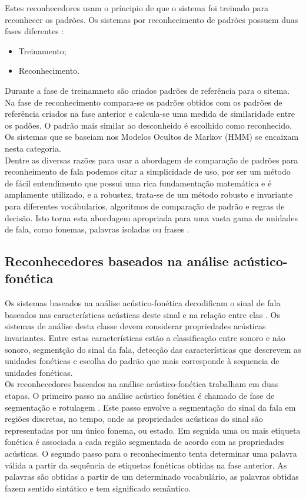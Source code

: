 Estes reconhecedores usam o príncipio de que o sistema foi treinado para reconhecer os padrões. Os sistemas por reconhecimento de padrões possuem duas fases diferentes :
\begin{itemize}
\item Treinamento;
\item Reconhecimento.
\end{itemize}

Durante a fase de treinamneto são criados padrões de referência para o sitema. Na fase de reconhecimento compara-se os padrões obtidos com os padrões de referência criados na fase anterior e calcula-se uma medida de similaridade entre os padões. O padrão mais similar ao desconheido é escolhido como reconhecido. Os sistemas que se baseiam nos Modelos Ocultos de Markov (HMM) se encaixam nesta categoria.\\

Dentre as diversas razões para usar a abordagem de comparação de padrões para reconheimento de fala podemos citar a simplicidade de uso, por ser um método de fácil entendimento que possui uma rica fundamentação matemática e é amplamente utilizado,  e a robustez, trata-se de um método robusto e invariante para diferentes vocábularios, algoritmos de comparação de padrão e regras de decisão. Isto torna esta abordagem apropriada para uma vasta gama de unidades de fala, como fonemas, palavras isoladas ou frases  \cite{fundRecFala}. 

\subsection{Reconhecedores baseados na análise acústico-fonética}

Os sistemas baseados na análise acústico-fonética decodificam o sinal de fala  baseados nas características acústicas deste sinal e na relação entre elas \cite{kluwer}. Os sistemas de análise desta classe devem considerar propriedades acústicas invariantes. Entre estas características estão a classificação entre sonoro e não sonoro, segmentção do sinal da fala, detecção das características que descrevem as unidades fonéticas e escolha do padrão que mais corresponde à sequencia de unidades fonéticas.\\

Os reconhecedores baseados na análise acústico-fonética trabalham em duas etapas. O primeiro passo na análise acústico fonética é chamado de fase de segmentação e rotulagem \cite{fundRecFala}. Este passo envolve a segmentação do sinal da fala em regiões discretas, no tempo, onde as propriedades acústicas do sinal são representadas por um único fonema, ou estado. Em seguida uma ou mais etiqueta fonética é associada a cada região segmentada de acordo com as propriedades acústicas. O segundo passo para o reconhecimento tenta determinar uma palavra válida a partir da sequência de etiquetas fonéticas obtidas na fase anterior. As palavras são obtidas a partir de um determinado vocabulário, as palavras obtidas fazem sentido sintático e tem significado semântico.


